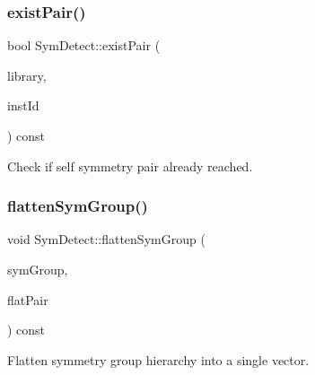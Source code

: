 \mbox{\label{classSymDetect_a72b24ce0ad3992c207f5023250dd1d5a}} 
\subsubsection{\texorpdfstring{exist\+Pair()}{existPair()}\hspace{0.1cm}{\footnotesize\ttfamily [2/2]}}
{\footnotesize\ttfamily bool Sym\+Detect\+::exist\+Pair (\begin{DoxyParamCaption}\item[{std\+::vector$<$ \hyperlink{classMosPair}{Mos\+Pair} $>$ \&}]{library,  }\item[{\hyperlink{type_8h_a581e8093e28e7362f2b6937296190676}{Index\+Type}}]{inst\+Id }\end{DoxyParamCaption}) const\hspace{0.3cm}{\ttfamily [private]}}

Check if self symmetry pair already reached. \mbox{\label{classSymDetect_a4c50f078fd01ab52e8f50b0507b69556}} 
\subsubsection{\texorpdfstring{flatten\+Sym\+Group()}{flattenSymGroup()}}
{\footnotesize\ttfamily void Sym\+Detect\+::flatten\+Sym\+Group (\begin{DoxyParamCaption}\item[{std\+::vector$<$ std\+::vector$<$ \hyperlink{classMosPair}{Mos\+Pair} $>$$>$ \&}]{sym\+Group,  }\item[{std\+::vector$<$ \hyperlink{classMosPair}{Mos\+Pair} $>$ \&}]{flat\+Pair }\end{DoxyParamCaption}) const\hspace{0.3cm}{\ttfamily [private]}}



Flatten symmetry group hierarchy into a single vector. 

\mbox{\label{classSymDetect_af04b93dac7e090cef8e741d8d1812485}} 
